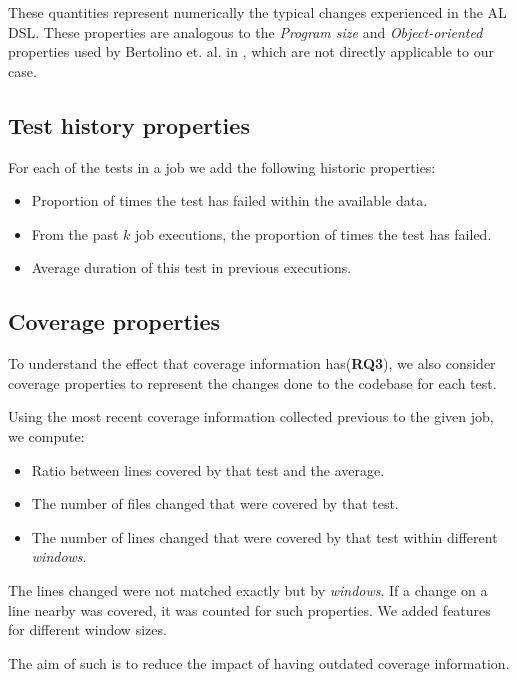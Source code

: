 These quantities represent numerically the typical changes experienced in the AL DSL. These properties are analogous to
the \emph{Program size} and \emph{Object-oriented} properties used by Bertolino et. al. in \cite{Bertolino2020LearningtoRankVR},
which are not directly applicable to our case.

\subsection{Test history properties}

For each of the tests in a job we add the following historic properties:

\begin{itemize}
    \item Proportion of times the test has failed within the available data.
    \item From the past $k$ job executions, the proportion of times the test has failed.
    \item Average duration of this test in previous executions.
\end{itemize}

\subsection{Coverage properties}
To understand the effect that coverage information has(\textbf{RQ3}), we also consider coverage properties
to represent the changes done to the codebase for each test.

Using the most recent coverage information collected previous to the given job, we compute:
\begin{itemize}
    \item Ratio between lines covered by that test and the average.
    \item The number of files changed that were covered by that test.
    \item The number of lines changed that were covered by that test within different \emph{windows}.
\end{itemize}

The lines changed were not matched exactly but by \emph{windows}. If a change on a
line nearby was covered, it was counted for such properties. We added features for
different window sizes.

The aim of such is to reduce the impact of having outdated coverage information.